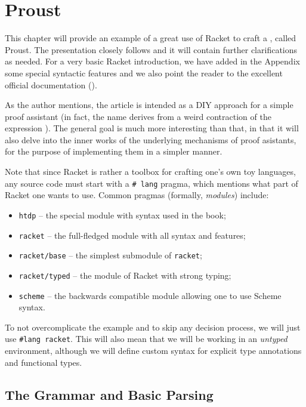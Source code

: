 \chapter{Proust}
\label{ch:proust}

This chapter will provide an example of a great use of Racket to craft
a , called Proust. The presentation closely
follows \cite{proust} and it will contain further clarifications as
needed. For a very basic Racket introduction, we have added in the
Appendix some special syntactic features and we also point the reader
to the excellent official documentation (\cite{racket}).

As the author mentions, the article is intended as a DIY approach
for a simple proof assistant (in fact, the name derives from a weird
contraction of the expression ). The general goal
is much more interesting than that, in that it will also delve into the
inner works of the underlying mechanisms of proof asistants, for the
purpose of implementing them in a simpler manner.

Note that since Racket is rather a toolbox for crafting one's own toy
languages, any source code must start with a \texttt{\#\!\!\! lang} pragma,
which mentions what part of Racket one wants to use. Common pragmas
(formally, \emph{modules}) include:
\begin{itemize}
\item \texttt{htdp} -- the special module with syntax used in the
  \cite{htdp} book;
\item \texttt{racket} -- the full-fledged module with all syntax and features;
\item \texttt{racket/base} -- the simplest submodule of \texttt{racket};
\item \texttt{racket/typed} -- the module of Racket with strong typing;
\item \texttt{scheme} -- the backwards compatible module allowing one
  to use Scheme syntax.
\end{itemize}

To not overcomplicate the example and to skip any decision process,
we will just use \texttt{\#lang racket}. This will also mean that
we will be working in an \emph{untyped} environment, although we will
define custom syntax for explicit type annotations and functional types.

\section{The Grammar and Basic Parsing}

